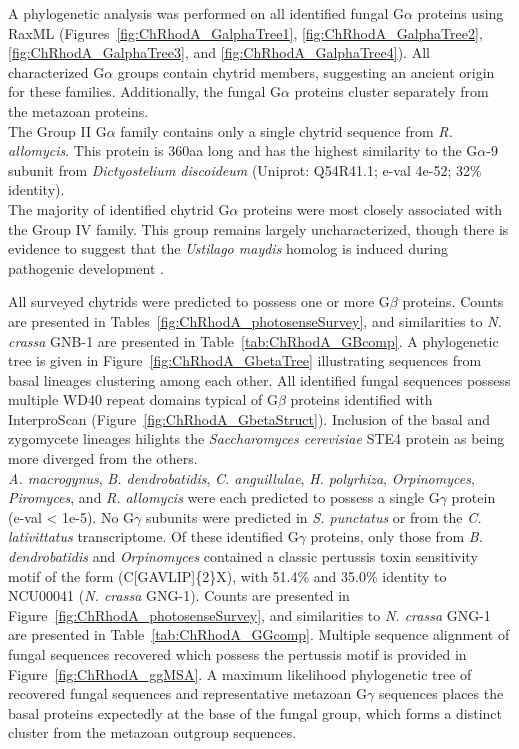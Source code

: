 \indent A phylogenetic analysis was performed on all identified fungal G$\alpha$ proteins using RaxML (Figures~\ref{fig:ChRhodA_GalphaTree1}, \ref{fig:ChRhodA_GalphaTree2}, \ref{fig:ChRhodA_GalphaTree3}, and \ref{fig:ChRhodA_GalphaTree4}). All characterized G$\alpha$ groups contain chytrid members, suggesting an ancient origin for these families. Additionally, the fungal G$\alpha$ proteins cluster separately from the metazoan proteins.\\
The Group II G$\alpha$ family contains only a single chytrid sequence from \textit{R. allomycis}. This protein is 360aa long and has the highest similarity to the G$\alpha$-9 subunit from \textit{Dictyostelium discoideum} (Uniprot: Q54R41.1; e-val 4e-52; 32\% identity).\\
The majority of identified chytrid G$\alpha$ proteins were most closely associated with the Group IV family. This group remains largely uncharacterized, though there is evidence to suggest that the \textit{Ustilago maydis} homolog is induced during pathogenic development \cite{Bolker1998}. 

\indent All surveyed chytrids were predicted to possess one or more G$\beta$ proteins. Counts are presented in Tables~\ref{fig:ChRhodA_photosenseSurvey}, and similarities to \textit{N. crassa} GNB-1 are presented in Table~\ref{tab:ChRhodA_GBcomp}. A phylogenetic
tree is given in Figure~\ref{fig:ChRhodA_GbetaTree} illustrating sequences from basal lineages clustering among each other. All identified fungal sequences possess multiple WD40 repeat domains typical of G$\beta$ proteins identified with InterproScan (Figure~\ref{fig:ChRhodA_GbetaStruct}). Inclusion of the basal and zygomycete lineages hilights the \textit{Saccharomyces cerevisiae} STE4 protein as being more diverged from the others.\\

\indent \textit{A. macrogynus}, \textit{B. dendrobatidis}, \textit{C. anguillulae}, \textit{H. polyrhiza}, \textit{Orpinomyces}, \textit{Piromyces}, and \textit{R. allomycis} were each predicted to possess a single G$\gamma$ protein (e-val < 1e-5). No G$\gamma$ subunits were predicted in \textit{S. punctatus} or from the \textit{C. lativittatus} transcriptome. Of these identified G$\gamma$ proteins, only those from \textit{B. dendrobatidis} and \textit{Orpinomyces} contained a classic pertussis toxin sensitivity motif of the form (C[GAVLIP]\{2\}X), with 51.4\% and 35.0\% identity to NCU00041 (\textit{N. crassa} GNG-1). Counts are presented in Figure~\ref{fig:ChRhodA_photosenseSurvey}, and similarities to \textit{N. crassa} GNG-1 are presented in Table~\ref{tab:ChRhodA_GGcomp}. Multiple sequence alignment of fungal sequences recovered which possess the pertussis motif is provided in Figure~\ref{fig:ChRhodA_ggMSA}. A maximum likelihood phylogenetic tree of recovered fungal sequences and representative metazoan G$\gamma$ sequences places the basal proteins expectedly at the base of the fungal group, which forms a distinct cluster from the metazoan outgroup sequences.\\

